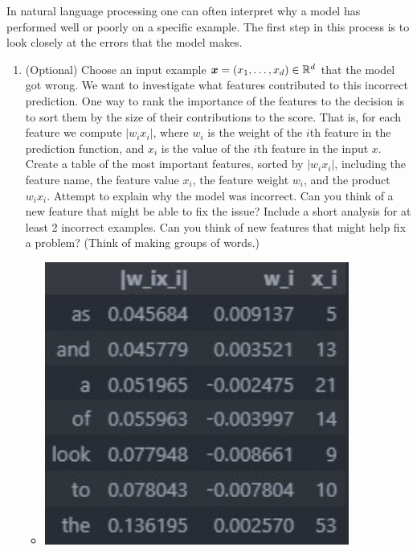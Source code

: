 \documentclass{article}
\theoremstyle{plain}
\theoremstyle{definition}
\begin{document}
In natural language processing 
one can often interpret why a model has performed well or poorly on
a specific example. The
first step in this process is to look closely at the errors that the
model makes.

\begin{enumerate}
  \setcounter{enumi}{\value{saveenum}}
\item \textcolor{nyupurple}{(Optional)} Choose an input example $\boldsymbol{x}=\left(x_{1},\ldots,x_{d}\right)\in\mathbb{R}^{d}$
that the model got wrong. We want to investigate what features contributed
to this incorrect prediction. One way to rank the importance of the
features to the decision is to sort them by the size of their contributions
to the score. That is, for each feature we compute $\left|w_{i}x_{i}\right|$,
where $w_{i}$ is the weight of the $i$th feature in the prediction
function, and $x_{i}$ is the value of the $i$th feature in the input
$x$. Create a table of the most important features, sorted by $\left|w_{i}x_{i}\right|$,
including the feature name, the feature value $x_{i}$, the feature
weight $w_{i}$, and the product $w_{i}x_{i}$. Attempt to explain
why the model was incorrect. Can you think of a new feature that might
be able to fix the issue? Include a short analysis for at least 2
incorrect examples.
Can you think of new features that might help fix a problem? (Think of making groups of words.)
\begin{itemize}
\color{blue}
\item \includegraphics[width=10cm]{homework/homework_3/immages/question_14_1.png.jpg}

\end{itemize}
\end{enumerate}
\end{document}

